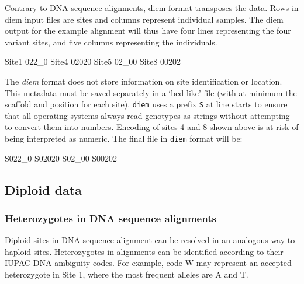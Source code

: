 \documentclass[
]{book}
\newenvironment{Shaded}{\begin{snugshade}}{\end{snugshade}}
\newcommand{\DecValTok}[1]{\textcolor[rgb]{0.00,0.00,0.81}{#1}}
\newcommand{\NormalTok}[1]{#1}
\begin{document}
Contrary to DNA sequence alignments, diem format transposes the data. Rows in diem input files are sites and columns represent individual samples. The diem output for the example alignment will thus have four lines representing the four variant sites, and five columns representing the individuals.

\begin{Shaded}
\begin{Highlighting}[]
\NormalTok{Site1   }\DecValTok{022}\NormalTok{\_0}
\NormalTok{Site4   }\DecValTok{02020}
\NormalTok{Site5   }\DecValTok{02}\NormalTok{\_00}
\NormalTok{Site8   }\DecValTok{00202}
\end{Highlighting}
\end{Shaded}

The \emph{diem} format does not store information on site identification or location. This metadata must be saved separately in a `bed-like' file (with at minimum the scaffold and position for each site). \texttt{diem} uses a prefix \texttt{S} at line starts to ensure that all operating systems always read genotypes as strings without attempting to convert them into numbers. Encoding of sites 4 and 8 shown above is at risk of being interpreted as numeric. The final file in \texttt{diem} format will be:

\begin{Shaded}
\begin{Highlighting}[]
\NormalTok{S022\_0}
\NormalTok{S02020}
\NormalTok{S02\_00}
\NormalTok{S00202}
\end{Highlighting}
\end{Shaded}

\subsection{Diploid data}\label{diploid-data}

\subsubsection{Heterozygotes in DNA sequence alignments}\label{heterozygotes-in-dna-sequence-alignments}

Diploid sites in DNA sequence alignment can be resolved in an analogous way to haploid sites. Heterozygotes in alignments can be identified according to their \href{https://www.ncbi.nlm.nih.gov/pmc/articles/PMC2865858/table/T1/}{IUPAC DNA ambiguity codes}. For example, code W may represent an accepted heterozygote in Site 1, where the most frequent alleles are A and T.
\end{document}
